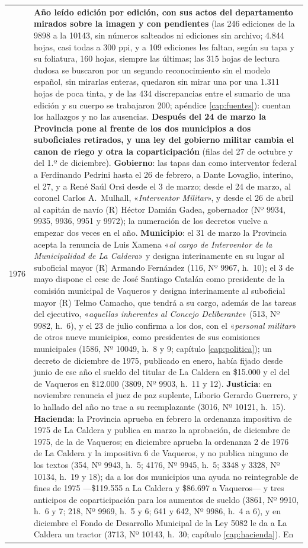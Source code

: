 \begin{longtable}{@{}p{2.7cm}p{10.3cm}@{}}
1976 & \textbf{Año leído edición por edición, con sus actos del departamento mirados sobre la imagen y con pendientes} (las 246 ediciones de la 9898 a la 10143, sin números salteados ni ediciones sin archivo; 4.844 hojas, casi todas a 300 ppi, y a 109 ediciones les faltan, según su tapa y su foliatura, 160 hojas, siempre las últimas; las 315 hojas de lectura dudosa se buscaron por un segundo reconocimiento sin el modelo español, sin mirarlas enteras, quedaron sin mirar una por una 1.311 hojas de poca tinta, y de las 434 discrepancias entre el sumario de una edición y su cuerpo se trabajaron 200; apéndice \ref{cap:fuentes}): cuentan los hallazgos y no las ausencias. \textbf{Después del 24 de marzo la Provincia pone al frente de los dos municipios a dos suboficiales retirados, y una ley del gobierno militar cambia el canon de riego y otra la coparticipación} (filas del 27 de octubre y del 1.º de diciembre). \textbf{Gobierno}: las tapas dan como interventor federal a Ferdinando Pedrini hasta el 26 de febrero, a Dante Lovaglio, interino, el 27, y a René Saúl Orsi desde el 3 de marzo; desde el 24 de marzo, al coronel Carlos A.\ Mulhall, «\textit{Interventor Militar}», y desde el 26 de abril al capitán de navío (R) Héctor Damián Gadea, gobernador (Nº 9934, 9935, 9936, 9951 y 9972); la numeración de los decretos vuelve a empezar dos veces en el año. \textbf{Municipio}: el 31 de marzo la Provincia acepta la renuncia de Luis Xamena «\textit{al cargo de Interventor de la Municipalidad de La Caldera}» y designa interinamente en su lugar al suboficial mayor (R) Armando Fernández (116, Nº 9967, h.\ 10); el 3 de mayo dispone el cese de José Santiago Catalán como presidente de la comisión municipal de Vaqueros y designa interinamente al suboficial mayor (R) Telmo Camacho, que tendrá a su cargo, además de las tareas del ejecutivo, «\textit{aquellas inherentes al Concejo Deliberante}» (513, Nº 9982, h.\ 6), y el 23 de julio confirma a los dos, con el «\textit{personal militar}» de otros nueve municipios, como presidentes de sus comisiones municipales (1586, Nº 10049, h.\ 8 y 9; capítulo \ref{cap:politica}); un decreto de diciembre de 1975, publicado en enero, había fijado desde junio de ese año el sueldo del titular de La Caldera en \$15.000 y el del de Vaqueros en \$12.000 (3809, Nº 9903, h.\ 11 y 12). \textbf{Justicia}: en noviembre renuncia el juez de paz suplente, Liborio Gerardo Guerrero, y lo hallado del año no trae a su reemplazante (3016, Nº 10121, h.\ 15). \textbf{Hacienda}: la Provincia aprueba en febrero la ordenanza impositiva de 1975 de La Caldera y publica en marzo la aprobación, de diciembre de 1975, de la de Vaqueros; en diciembre aprueba la ordenanza 2 de 1976 de La Caldera y la impositiva 6 de Vaqueros, y no publica ninguno de los textos (354, Nº 9943, h.\ 5; 4176, Nº 9945, h.\ 5; 3348 y 3328, Nº 10134, h.\ 19 y 18); da a los dos municipios una ayuda no reintegrable de fines de 1975 ---\$119.555 a La Caldera y \$86.697 a Vaqueros--- y tres anticipos de coparticipación para los aumentos de sueldo (3861, Nº 9910, h.\ 6 y 7; 218, Nº 9969, h.\ 5 y 6; 641 y 642, Nº 9986, h.\ 4 a 6), y en diciembre el Fondo de Desarrollo Municipal de la Ley 5082 le da a La Caldera un tractor (3713, Nº 10143, h.\ 30; capítulo \ref{cap:hacienda}). En 
\end{longtable}
